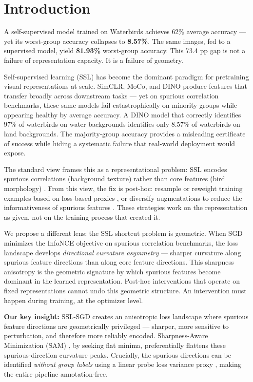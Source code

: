 \section{Introduction}

A self-supervised model trained on Waterbirds achieves 62\% average accuracy --- yet its worst-group accuracy collapses to \textbf{8.57\%}. The same images, fed to a supervised model, yield \textbf{81.93\%} worst-group accuracy. This 73.4 pp gap is not a failure of representation capacity. It is a failure of geometry.

Self-supervised learning (SSL) has become the dominant paradigm for pretraining visual representations at scale. SimCLR, MoCo, and DINO produce features that transfer broadly across downstream tasks --- yet on spurious correlation benchmarks, these same models fail catastrophically on minority groups while appearing healthy by average accuracy. A DINO model that correctly identifies 97\% of waterbirds on water backgrounds identifies only 8.57\% of waterbirds on land backgrounds. The majority-group accuracy provides a misleading certificate of success while hiding a systematic failure that real-world deployment would expose.

The standard view frames this as a representational problem: SSL encodes spurious correlations (background texture) rather than core features (bird morphology) \citep{zhang2022contrastive, yadav2026crossvariant}. From this view, the fix is post-hoc: resample or reweight training examples based on loss-based proxies \citep{ghaznavi2023lfr}, or diversify augmentations to reduce the informativeness of spurious features \citep{yadav2026crossvariant}. These strategies work on the representation as given, not on the training process that created it.

We propose a different lens: the SSL shortcut problem is geometric. When SGD minimizes the InfoNCE objective on spurious correlation benchmarks, the loss landscape develops \textit{directional curvature asymmetry} --- sharper curvature along spurious feature directions than along core feature directions. This sharpness anisotropy is the geometric signature by which spurious features become dominant in the learned representation. Post-hoc interventions that operate on fixed representations cannot undo this geometric structure. An intervention must happen during training, at the optimizer level.

\textbf{Our key insight:} SSL-SGD creates an anisotropic loss landscape where spurious feature directions are geometrically privileged --- sharper, more sensitive to perturbation, and therefore more reliably encoded. Sharpness-Aware Minimization (SAM) \citep{foret2021sam}, by seeking flat minima, preferentially flattens these spurious-direction curvature peaks. Crucially, the spurious directions can be identified \textit{without group labels} using a linear probe loss variance proxy \citep{ghaznavi2023lfr}, making the entire pipeline annotation-free.


